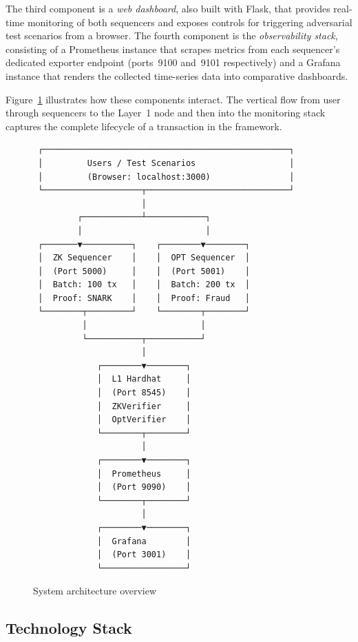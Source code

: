 The third component is a \textit{web dashboard}, also built with Flask, that provides real-time monitoring of both sequencers and exposes controls for triggering adversarial test scenarios from a browser. The fourth component is the \textit{observability stack}, consisting of a Prometheus instance that scrapes metrics from each sequencer's dedicated exporter endpoint (ports~9100 and~9101 respectively) and a Grafana instance that renders the collected time-series data into comparative dashboards.

Figure~\ref{fig:architecture} illustrates how these components interact. The vertical flow from user through sequencers to the Layer~1 node and then into the monitoring stack captures the complete lifecycle of a transaction in the framework.

\begin{figure}[h]
    \centering
    \begin{verbatim}
 ┌──────────────────────────────────────────────────┐
 │         Users / Test Scenarios                   │
 │         (Browser: localhost:3000)                │
 └────────────────────┬─────────────────────────────┘
                      │
         ┌────────────┴────────────┐
         │                         │
 ┌───────▼──────────┐    ┌────────▼────────┐
 │  ZK Sequencer    │    │  OPT Sequencer  │
 │  (Port 5000)     │    │  (Port 5001)    │
 │  Batch: 100 tx   │    │  Batch: 200 tx  │
 │  Proof: SNARK    │    │  Proof: Fraud   │
 └────────┬─────────┘    └────────┬────────┘
          │                       │
          └───────────┬───────────┘
                      │
             ┌────────▼────────┐
             │  L1 Hardhat     │
             │  (Port 8545)    │
             │  ZKVerifier     │
             │  OptVerifier    │
             └────────┬────────┘
                      │
             ┌────────▼────────┐
             │  Prometheus     │
             │  (Port 9090)    │
             └────────┬────────┘
                      │
             ┌────────▼────────┐
             │  Grafana        │
             │  (Port 3001)    │
             └─────────────────┘
    \end{verbatim}
    \caption{System architecture overview}
    \label{fig:architecture}
\end{figure}

\subsection{Technology Stack}


